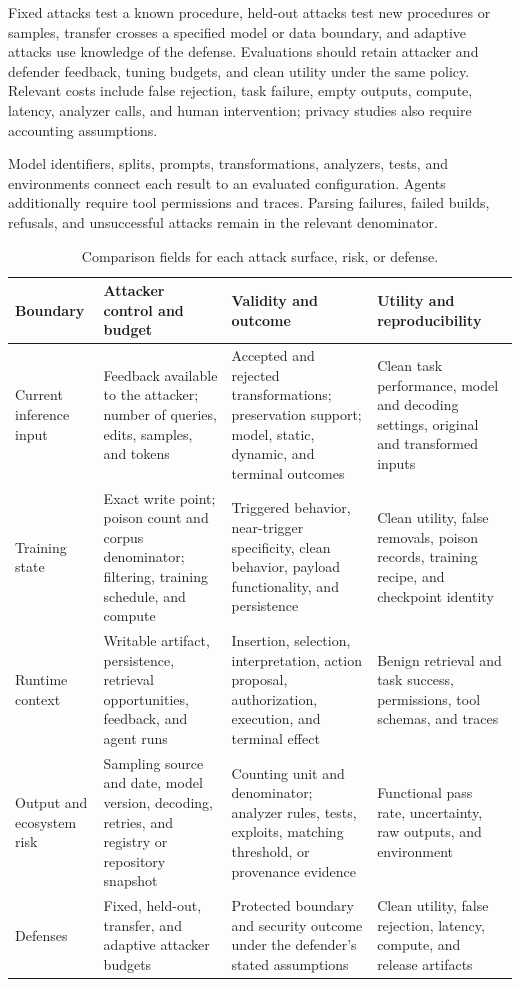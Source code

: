 \documentclass[acmsmall,screen,review,nonacm]{acmart}
\begin{document}
Fixed attacks test a known procedure, held-out attacks test new procedures or samples, transfer crosses a specified model or data boundary, and adaptive attacks use knowledge of the defense. Evaluations should retain attacker and defender feedback, tuning budgets, and clean utility under the same policy. Relevant costs include false rejection, task failure, empty outputs, compute, latency, analyzer calls, and human intervention; privacy studies also require accounting assumptions.

Model identifiers, splits, prompts, transformations, analyzers, tests, and environments connect each result to an evaluated configuration. Agents additionally require tool permissions and traces. Parsing failures, failed builds, refusals, and unsuccessful attacks remain in the relevant denominator.

\begin{table}[t]
\centering
\small
\caption{Comparison fields for each attack surface, risk, or defense.}
\label{tab:reporting-checklist}
\begin{tabularx}{\textwidth}{@{}L{2.15cm}L{3.70cm}L{3.70cm}Y@{}}
\toprule
\textbf{Boundary} & \textbf{Attacker control and budget} & \textbf{Validity and outcome} & \textbf{Utility and reproducibility} \\
\midrule
Current inference input & Feedback available to the attacker; number of queries, edits, samples, and tokens & Accepted and rejected transformations; preservation support; model, static, dynamic, and terminal outcomes & Clean task performance, model and decoding settings, original and transformed inputs \\
Training state & Exact write point; poison count and corpus denominator; filtering, training schedule, and compute & Triggered behavior, near-trigger specificity, clean behavior, payload functionality, and persistence & Clean utility, false removals, poison records, training recipe, and checkpoint identity \\
Runtime context & Writable artifact, persistence, retrieval opportunities, feedback, and agent runs & Insertion, selection, interpretation, action proposal, authorization, execution, and terminal effect & Benign retrieval and task success, permissions, tool schemas, and traces \\
Output and ecosystem risk & Sampling source and date, model version, decoding, retries, and registry or repository snapshot & Counting unit and denominator; analyzer rules, tests, exploits, matching threshold, or provenance evidence & Functional pass rate, uncertainty, raw outputs, and environment \\
Defenses & Fixed, held-out, transfer, and adaptive attacker budgets & Protected boundary and security outcome under the defender's stated assumptions & Clean utility, false rejection, latency, compute, and release artifacts \\
\bottomrule
\end{tabularx}
\end{table}
\end{document}
